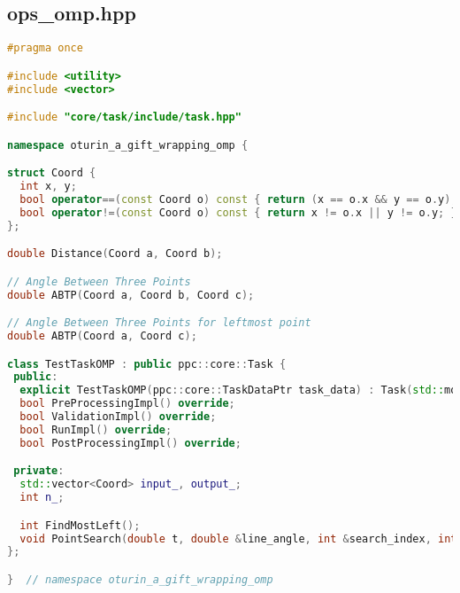 \documentclass[12pt,a4paper]{extarticle}
\begin{document}
\subsection{ops\_omp.hpp}
\label{sec:omp.hpp}
\begin{lstlisting}[language=C++]
#pragma once

#include <utility>
#include <vector>

#include "core/task/include/task.hpp"

namespace oturin_a_gift_wrapping_omp {

struct Coord {
  int x, y;
  bool operator==(const Coord o) const { return (x == o.x && y == o.y); }
  bool operator!=(const Coord o) const { return x != o.x || y != o.y; }
};

double Distance(Coord a, Coord b);

// Angle Between Three Points
double ABTP(Coord a, Coord b, Coord c);

// Angle Between Three Points for leftmost point
double ABTP(Coord a, Coord c);

class TestTaskOMP : public ppc::core::Task {
 public:
  explicit TestTaskOMP(ppc::core::TaskDataPtr task_data) : Task(std::move(task_data)) {}
  bool PreProcessingImpl() override;
  bool ValidationImpl() override;
  bool RunImpl() override;
  bool PostProcessingImpl() override;

 private:
  std::vector<Coord> input_, output_;
  int n_;

  int FindMostLeft();
  void PointSearch(double t, double &line_angle, int &search_index, int i);
};

}  // namespace oturin_a_gift_wrapping_omp
\end{lstlisting}
\end{document}

